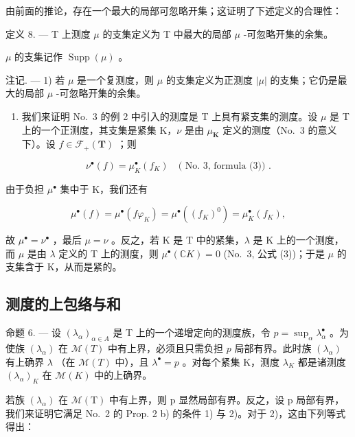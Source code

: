 由前面的推论，存在一个最大的局部可忽略开集；这证明了下述定义的合理性：

定义 8. --- T 上测度 \(\mu\) 的支集定义为 T 中最大的局部 \(\mu\) -可忽略开集的余集。

\(\mu\) 的支集记作 \(\operatorname{Supp}(\mu)\) 。

注记. --- 1) 若 \(\mu\) 是一个复测度，则 \(\mu\) 的支集定义为正测度 \(|\mu|\) 的支集；它仍是最大的局部 \(\mu\) -可忽略开集的余集。

\begin{enumerate}
\def\labelenumi{\arabic{enumi})}
\setcounter{enumi}{1}
\tightlist
\item
  我们来证明 No.~3 的例 2 中引入的测度是 T 上具有紧支集的测度。设 \(\mu\) 是 T 上的一个正测度，其支集是紧集 K，\(\nu\) 是由 \(\mu_{\mathbf{K}}\) 定义的测度（No.~3 的意义下）。设 \(f \in \mathcal{F}_{+}(\mathbf{T})\) ；则
\end{enumerate}

\[
\nu^ {\bullet} (f) = \mu_ {K} ^ {\bullet} (f _ {K}) \quad (\text { No.   3,   formula   (3)) }.
\]

由于负担 \(\mu^{\bullet}\) 集中于 K，我们还有

\[
\mu^ {\bullet} (f) = \mu^ {\bullet} (f \varphi_ {K}) = \mu^ {\bullet} ((f _ {K}) ^ {0}) = \mu_ {K} ^ {\bullet} (f _ {K}),
\]

故 \(\mu^{\bullet} = \nu^{\bullet}\) ，最后 \(\mu = \nu\) 。反之，若 K 是 T 中的紧集，\(\lambda\) 是 K 上的一个测度，而 \(\mu\) 是由 \(\lambda\) 定义的 T 上的测度，则 \(\mu^{\bullet}(\mathbb{C}K) = 0\) (No.~3, 公式 (3))；于是 \(\mu\) 的支集含于 K，从而是紧的。

\subsection{测度的上包络与和}

命题 6. --- 设 \((\lambda_{\alpha})_{\alpha \in A}\) 是 T 上的一个递增定向的测度族，令 \(p = \sup_{\alpha} \lambda_{\alpha}^{\bullet}\) 。为使族 \((\lambda_{\alpha})\) 在 \(\mathcal{M}(T)\) 中有上界，必须且只需负担 \(p\) 局部有界。此时族 \((\lambda_{\alpha})\) 有上确界 \(\lambda\) （在 \(\mathcal{M}(T)\) 中），且 \(\lambda^{\bullet} = p\) 。对每个紧集 K，测度 \(\lambda_{K}\) 都是诸测度 \((\lambda_{\alpha})_{K}\) 在 \(\mathcal{M}(K)\) 中的上确界。

若族 \((\lambda_{\alpha})\) 在 \(\mathcal{M}(\mathrm{T})\) 中有上界，则 p 显然局部有界。反之，设 p 局部有界，我们来证明它满足 No.~2 的 Prop. 2 b) 的条件 1) 与 2)。对于 2)，这由下列等式得出：

